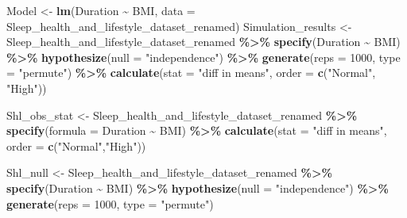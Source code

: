 \documentclass[
  11pt,
]{article}
\newenvironment{Shaded}{\begin{snugshade}}{\end{snugshade}}
\newcommand{\AttributeTok}[1]{\textcolor[rgb]{0.13,0.29,0.53}{#1}}
\newcommand{\DecValTok}[1]{\textcolor[rgb]{0.00,0.00,0.81}{#1}}
\newcommand{\FunctionTok}[1]{\textcolor[rgb]{0.13,0.29,0.53}{\textbf{#1}}}
\newcommand{\NormalTok}[1]{#1}
\newcommand{\OtherTok}[1]{\textcolor[rgb]{0.56,0.35,0.01}{#1}}
\newcommand{\SpecialCharTok}[1]{\textcolor[rgb]{0.81,0.36,0.00}{\textbf{#1}}}
\newcommand{\StringTok}[1]{\textcolor[rgb]{0.31,0.60,0.02}{#1}}
\begin{document}
\begin{Shaded}
\begin{Highlighting}[]
\NormalTok{Model }\OtherTok{\textless{}{-}} \FunctionTok{lm}\NormalTok{(Duration }\SpecialCharTok{\textasciitilde{}}\NormalTok{ BMI, }\AttributeTok{data =}\NormalTok{ Sleep\_health\_and\_lifestyle\_dataset\_renamed)}
\NormalTok{Simulation\_results }\OtherTok{\textless{}{-}}
\NormalTok{  Sleep\_health\_and\_lifestyle\_dataset\_renamed }\SpecialCharTok{\%\textgreater{}\%}
  \FunctionTok{specify}\NormalTok{(Duration }\SpecialCharTok{\textasciitilde{}}\NormalTok{ BMI) }\SpecialCharTok{\%\textgreater{}\%}
  \FunctionTok{hypothesize}\NormalTok{(}\AttributeTok{null =} \StringTok{"independence"}\NormalTok{) }\SpecialCharTok{\%\textgreater{}\%}
  \FunctionTok{generate}\NormalTok{(}\AttributeTok{reps =} \DecValTok{1000}\NormalTok{, }\AttributeTok{type =} \StringTok{"permute"}\NormalTok{) }\SpecialCharTok{\%\textgreater{}\%} 
  \FunctionTok{calculate}\NormalTok{(}\AttributeTok{stat =} \StringTok{"diff in means"}\NormalTok{, }\AttributeTok{order =} \FunctionTok{c}\NormalTok{(}\StringTok{"Normal"}\NormalTok{, }\StringTok{"High"}\NormalTok{))}
\end{Highlighting}
\end{Shaded}

\begin{Shaded}
\begin{Highlighting}[]
\NormalTok{Shl\_obs\_stat }\OtherTok{\textless{}{-}}
\NormalTok{  Sleep\_health\_and\_lifestyle\_dataset\_renamed }\SpecialCharTok{\%\textgreater{}\%}
  \FunctionTok{specify}\NormalTok{(}\AttributeTok{formula =}\NormalTok{ Duration }\SpecialCharTok{\textasciitilde{}}\NormalTok{ BMI) }\SpecialCharTok{\%\textgreater{}\%}
  \FunctionTok{calculate}\NormalTok{(}\AttributeTok{stat =} \StringTok{"diff in means"}\NormalTok{, }\AttributeTok{order =} \FunctionTok{c}\NormalTok{(}\StringTok{"Normal"}\NormalTok{,}\StringTok{"High"}\NormalTok{))}
\end{Highlighting}
\end{Shaded}

\begin{Shaded}
\begin{Highlighting}[]
\NormalTok{Shl\_null }\OtherTok{\textless{}{-}}\NormalTok{ Sleep\_health\_and\_lifestyle\_dataset\_renamed }\SpecialCharTok{\%\textgreater{}\%}
  \FunctionTok{specify}\NormalTok{(Duration }\SpecialCharTok{\textasciitilde{}}\NormalTok{ BMI) }\SpecialCharTok{\%\textgreater{}\%}
  \FunctionTok{hypothesize}\NormalTok{(}\AttributeTok{null =} \StringTok{"independence"}\NormalTok{) }\SpecialCharTok{\%\textgreater{}\%}
  \FunctionTok{generate}\NormalTok{(}\AttributeTok{reps =} \DecValTok{1000}\NormalTok{, }\AttributeTok{type =} \StringTok{"permute"}\NormalTok{)}
\end{Highlighting}
\end{Shaded}
\end{document}
